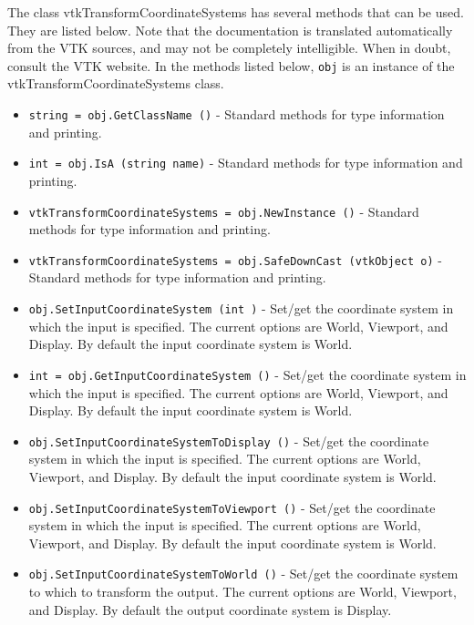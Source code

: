 The class vtkTransformCoordinateSystems has several methods that can be used.
  They are listed below.
Note that the documentation is translated automatically from the VTK sources,
and may not be completely intelligible.  When in doubt, consult the VTK website.
In the methods listed below, \verb|obj| is an instance of the vtkTransformCoordinateSystems class.
\begin{itemize}
\item  \verb|string = obj.GetClassName ()| -  Standard methods for type information and printing.

\item  \verb|int = obj.IsA (string name)| -  Standard methods for type information and printing.

\item  \verb|vtkTransformCoordinateSystems = obj.NewInstance ()| -  Standard methods for type information and printing.

\item  \verb|vtkTransformCoordinateSystems = obj.SafeDownCast (vtkObject o)| -  Standard methods for type information and printing.

\item  \verb|obj.SetInputCoordinateSystem (int )| -  Set/get the coordinate system in which the input is specified.
 The current options are World, Viewport, and Display. By default the
 input coordinate system is World.

\item  \verb|int = obj.GetInputCoordinateSystem ()| -  Set/get the coordinate system in which the input is specified.
 The current options are World, Viewport, and Display. By default the
 input coordinate system is World.

\item  \verb|obj.SetInputCoordinateSystemToDisplay ()| -  Set/get the coordinate system in which the input is specified.
 The current options are World, Viewport, and Display. By default the
 input coordinate system is World.

\item  \verb|obj.SetInputCoordinateSystemToViewport ()| -  Set/get the coordinate system in which the input is specified.
 The current options are World, Viewport, and Display. By default the
 input coordinate system is World.

\item  \verb|obj.SetInputCoordinateSystemToWorld ()| -  Set/get the coordinate system to which to transform the output.
 The current options are World, Viewport, and Display. By default the
 output coordinate system is Display.


\end{itemize}
